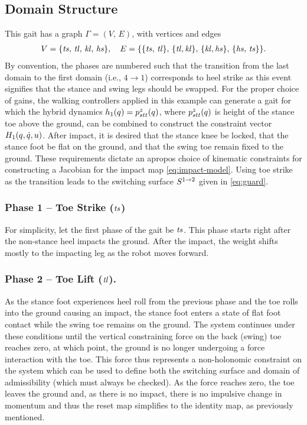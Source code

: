 \subsection{Domain Structure}

This gait has a graph $\Gamma = (V, \, E)$, with vertices and edges
\begin{align*}
  V = \{\mathit{ts}, \, \mathit{tl}, \, \mathit{kl}, \, \mathit{hs}\}, \quad  E = \{\{\mathit{ts}, \, \mathit{tl}\}, \, \{\mathit{tl}, \mathit{kl}\}, \, \{\mathit{kl}, \mathit{hs}\}, \, \{\mathit{hs}, \,
  \mathit{ts}\}\}.
\end{align*}
By convention, the phases are numbered such that the transition from the last
domain to the first domain (i.e., $4 \to 1$) corresponds to heel strike as this
event signifies that the stance and swing legs should be swapped.
% 
For the proper choice of gains, the walking controllers applied in this example
can generate a gait for which the hybrid dynamics $h_{1}(q) = p_{stt}^{z}(q)$,
where $p_{stt}^{z}(q)$ is height of the stance toe above the ground, can be
combined to construct the constraint vector $H_{1}(q, \dot{q}, u)$. 
% 
After impact, it is desired that the stance knee be locked, that the stance foot
be flat on the ground, and that the swing toe remain fixed to the ground.
% 
These requirements dictate an apropos choice of kinematic constraints for
constructing a Jacobian for the impact map \eqref{eq:impact-model}.
% 
Using toe strike as the transition leads to the switching surface
$S^{1 \to 2}$ given in \eqref{eq:guard}.
%


\subsubsection{Phase 1 -- Toe Strike ($\mathit{ts}$)}

For simplicity, let the first phase of the gait be $\mathit{ts}$.
%
This phase starts right after the non-stance heel impacts the ground.
%
After the impact, the weight shifts mostly to the impacting leg as the robot
moves forward.



\subsubsection{Phase 2 -- Toe Lift ($\mathit{tl}$).}
 
As the stance foot experiences heel roll from the previous phase and the toe
rolls into the ground causing an impact, the stance foot enters a state of flat
foot contact while the swing toe remains on the ground.
% 
The system continues under these conditions until the vertical constraining
force on the back (swing) toe reaches zero, at which point, the ground is no
longer undergoing a force interaction with the toe.
% 
This force thus represents a non-holonomic constraint on the system which can be
used to define both the switching surface and domain of admissibility (which
must always be checked).
% 
As the force reaches zero, the toe leaves the ground and, as there is no impact,
there is no impulsive change in momentum and thus the reset map simplifies to
the identity map, as previously mentioned.


